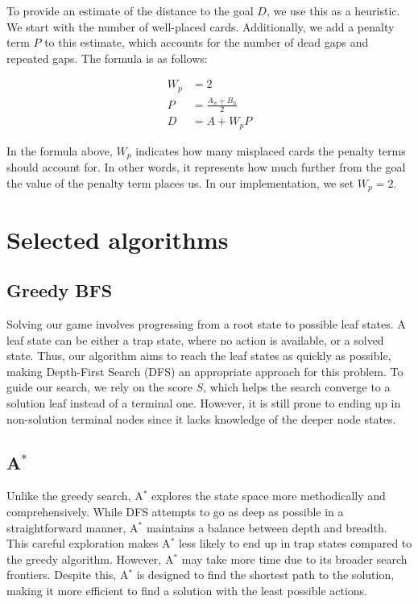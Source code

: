 To provide an estimate of the distance to the goal $D$, we use this as a heuristic. We start with the number of well-placed cards. Additionally, we add a penalty term $P$ to this estimate, which accounts for the number of dead gaps and repeated gaps. The formula is as follows:

\begin{align}
W_p &= 2 \\
P &= \frac{A_n + B_n}{2} \\
D &= A + W_pP
\end{align}

In the formula above, $W_p$ indicates how many misplaced cards the penalty terms should account for. In other words, it represents how much further from the goal the value of the penalty term places us. In our implementation, we set $W_p = 2$.


\section{Selected algorithms}
\subsection{Greedy BFS}
Solving our game involves progressing from a root state to possible leaf states. A leaf state can be either a trap state, where no action is available, or a solved state. Thus, our algorithm aims to reach the leaf states as quickly as possible, making Depth-First Search (DFS) an appropriate approach for this problem. To guide our search, we rely on the score $S$, which helps the search converge to a solution leaf instead of a terminal one. However, it is still prone to ending up in non-solution terminal nodes since it lacks knowledge of the deeper node states.

\subsection{A$^*$}
Unlike the greedy search, A$^*$ explores the state space more methodically and comprehensively. While DFS attempts to go as deep as possible in a straightforward manner, A$^*$ maintains a balance between depth and breadth. This careful exploration makes A$^*$ less likely to end up in trap states compared to the greedy algorithm. However, A$^*$ may take more time due to its broader search frontiers. Despite this, A$^*$ is designed to find the shortest path to the solution, making it more efficient to find a solution with the least possible actions.

